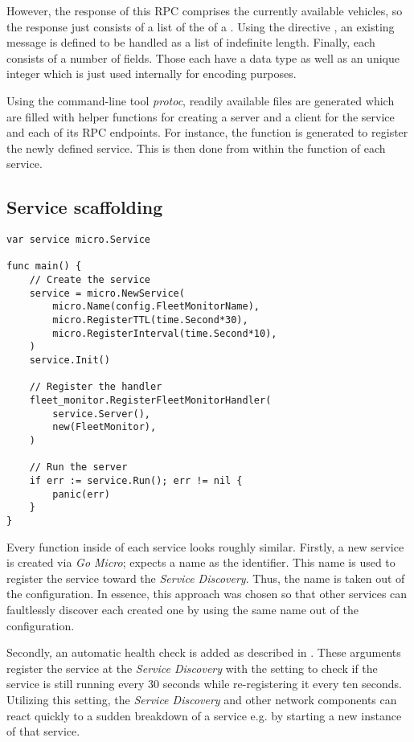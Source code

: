\documentclass[12pt,a4paper,twoside]{report}
\begin{document}
However, the response of this RPC comprises the currently available vehicles,
so the response just consists of a list of the  of a .
Using the directive , an existing message is defined to be
handled as a list of indefinite length.
Finally, each  consists of a number of fields. Those each have
a data type as well as an unique integer which is just used internally for
encoding purposes.

Using the command-line tool \textit{protoc}, readily available  files
are generated which are filled with helper functions for creating
a server and a client for the service and each of its RPC endpoints.
For instance, the function  is generated
to register the newly defined service.
This is then done from within the  function of each service.

\subsection{Service scaffolding}

\begin{lstlisting}[title=services/fleet-monitor/main.go]
var service micro.Service

func main() {
	// Create the service
	service = micro.NewService(
		micro.Name(config.FleetMonitorName),
		micro.RegisterTTL(time.Second*30),
		micro.RegisterInterval(time.Second*10),
	)
	service.Init()

    // Register the handler
	fleet_monitor.RegisterFleetMonitorHandler(
		service.Server(),
		new(FleetMonitor),
	)

    // Run the server
	if err := service.Run(); err != nil {
		panic(err)
	}
}
\end{lstlisting}

Every  function inside of each service looks roughly similar.
Firstly, a new service is created via \textit{Go Micro};
 expects a name as the identifier.
This name is used to register the service toward the \textit{Service Discovery}.
Thus, the name is taken out of the configuration.
In essence, this approach was chosen so that other services can
faultlessly discover each created one by using the same name out of the configuration.

Secondly, an automatic health check is added as described in
. These arguments register the service
at the \textit{Service Discovery} with the setting to check if the service is
still running every 30 seconds while re-registering it every ten seconds.
Utilizing this setting, the \textit{Service Discovery} and other
network components can react quickly to a sudden breakdown of a service e.g.
by starting a new instance of that service.
\end{document}
